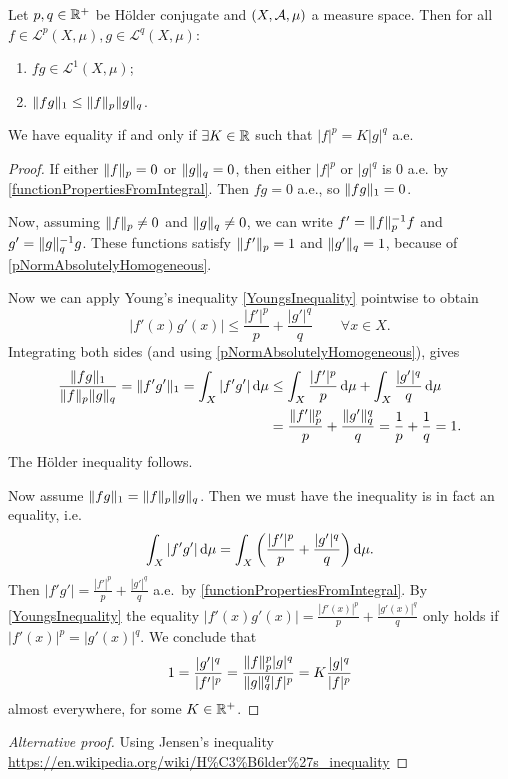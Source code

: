 \begin{theorem} \label{HoeldersInequality}
Let $p,q\in \mathbb{R}^+$ be Hölder conjugate and $\sSet{X,\mathcal{A},\mu}$ a measure space. Then for all $f\in \mathcal{L}^p(X,\mu), g\in \mathcal{L}^q(X,\mu)$:
\begin{enumerate}
\item $fg\in \mathcal{L}^1(X,\mu)$;
\item $\lVert fg\rVert_1 \leq \lVert f\rVert_p\lVert g\rVert_q$.
\end{enumerate}
We have equality \textup{if and only if} $\exists K\in \mathbb{R}$ such that $|f|^p = K|g|^q$ a.e.
\end{theorem}
\begin{proof}
If either $\lVert f\rVert_p = 0$ or $\lVert g\rVert_q = 0$, then either $|f|^p$ or $|g|^q$ is $0$ a.e. by \ref{functionPropertiesFromIntegral}. Then $fg = 0$ a.e., so $\lVert fg\rVert_1 = 0$.

Now, assuming $\lVert f\rVert_p \neq 0$ and $\lVert g\rVert_q \neq 0$, we can write $f' = \lVert f\rVert_p^{-1}f$ and $g' = \lVert g\rVert_q^{-1}g$.
These functions satisfy $\lVert f'\rVert_p = 1$ and $\lVert g'\rVert_q = 1$, because of \ref{pNormAbsolutelyHomogeneous}.

Now we can apply Young's inequality \ref{YoungsInequality} pointwise to obtain
\[ |f'(x)g'(x)| \leq \frac{|f'|^p}{p} + \frac{|g'|^q}{q} \qquad \forall x\in X. \]
Integrating both sides (and using \ref{pNormAbsolutelyHomogeneous}), gives
\begin{align*}
\frac{\lVert fg\rVert_1}{\lVert f\rVert_p\lVert g\rVert_q} = \lVert f'g'\rVert_1 = \int_X|f'g'|\operatorname{d \!}{\mu} &\leq \int_X\frac{|f'|^p}{p}\operatorname{d \!}{\mu} + \int_X\frac{|g'|^q}{q}\operatorname{d \!}{\mu} \\
&= \frac{\lVert f'\rVert_p^p}{p} + \frac{\lVert g'\rVert_q^q}{q} = \frac{1}{p} + \frac{1}{q} = 1.
\end{align*}
The Hölder inequality follows.

Now assume $\lVert fg\rVert_1 = \lVert f\rVert_p\lVert g\rVert_q$. Then we must have the inequality is in fact an equality, i.e.\ 
\[ \int_X|f'g'|\operatorname{d \!}{\mu} = \int_X\left(\frac{|f'|^p}{p} + \frac{|g'|^q}{q}\right)\operatorname{d \!}{\mu}. \]
Then $|f'g'| = \frac{|f'|^p}{p} + \frac{|g'|^q}{q}$ a.e.\ by \ref{functionPropertiesFromIntegral}. By \ref{YoungsInequality} the equality $|f'(x)g'(x)| = \frac{|f'(x)|^p}{p} + \frac{|g'(x)|^q}{q}$ only holds if $|f'(x)|^p = |g'(x)|^q$. We conclude that
\[ 1 = \frac{|g'|^q}{|f'|^p} = \frac{\lVert f\rVert_p^p |g|^q}{\lVert g\rVert_q^q |f|^p} = K \frac{|g|^q}{|f|^p} \]
almost everywhere, for some $K\in \mathbb{R}^+$.
\end{proof}
\begin{proof}[Alternative proof]
Using Jensen's inequality \url{https://en.wikipedia.org/wiki/H%C3%B6lder%27s_inequality}
\end{proof}


